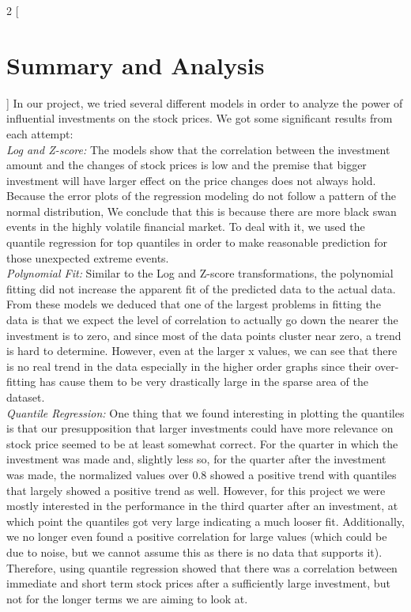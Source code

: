 \documentclass{article}
\begin{document}
\begin{multicols}{2}
[\section*{Summary and Analysis}]
In our project, we tried several different models in order to analyze the power of influential investments on the stock prices. We got some significant results from each attempt:\\

\textit{Log and Z-score:} The models show that the correlation between the investment amount and the changes of stock prices is low and the premise that bigger investment will have larger effect on the price changes does not always hold. Because the error plots of the regression modeling do not follow a pattern of the normal distribution,  We conclude that this is because there are more black swan events in the highly volatile financial market. To deal with it, we used the quantile regression for top quantiles in order to make reasonable prediction for those unexpected extreme events. \\

\textit{Polynomial Fit:} Similar to the Log and Z-score transformations, the polynomial fitting did not increase the apparent fit of the predicted data to the actual data. From these models we deduced that one of the largest problems in fitting the data is that we expect the level of correlation to actually go down the nearer the investment is to zero, and since most of the data points cluster near zero, a trend is hard to determine. However, even at the larger x values, we can see that there is no real trend in the data especially in the higher order graphs since their over-fitting has cause them to be very drastically large in the sparse area of the dataset.\\

\textit{Quantile Regression: }
One thing that we found interesting in plotting the quantiles is that our presupposition that larger investments could have more relevance on stock price seemed to be at least somewhat correct. For the quarter in which the investment was made and, slightly less so, for the quarter after the investment was made,  the normalized values over 0.8 showed a positive trend with quantiles that largely showed a positive trend as well. However, for this project we were mostly interested in the performance in the third quarter after an investment, at which point the quantiles got very large indicating a much looser fit. Additionally, we no longer even found a positive correlation for large values (which could be due to noise, but we cannot assume this as there is no data that supports it). Therefore, using quantile regression showed that there was a correlation between immediate and short term stock prices after a sufficiently large investment, but not for the longer terms we are aiming to look at.
\\


\end{multicols}
\end{document}
